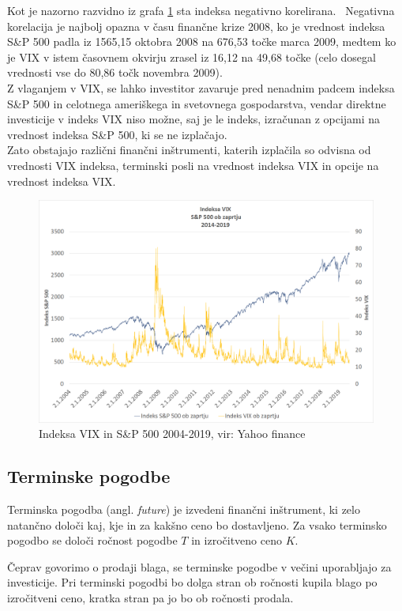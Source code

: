 \documentclass[12pt,a4paper]{amsart}
\theoremstyle{definition} %
\theoremstyle{plain} %
\begin{document}
Kot je nazorno razvidno iz grafa \ref{Graf 2} sta indeksa negativno korelirana. \
Negativna korelacija je najbolj opazna v času finančne krize 2008, ko je vrednost indeksa S\&P 500 padla iz 1565,15 oktobra 2008 na 676,53 točke marca 2009, medtem ko je VIX v istem časovnem okvirju zrasel iz 16,12 na 49,68 točke (celo dosegal vrednosti vse do 80,86 točk novembra 2009). \\
Z vlaganjem v VIX, se lahko investitor zavaruje pred nenadnim padcem indeksa S\&P 500 in celotnega ameriškega in svetovnega gospodarstva, vendar direktne investicije v indeks VIX niso možne, saj je le indeks, izračunan z  opcijami na vrednost indeksa S\&P 500, ki se ne izplačajo.\\
Zato obstajajo različni finančni inštrumenti, katerih izplačila so odvisna od vrednosti VIX indeksa, terminski posli na vrednost indeksa VIX in opcije na vrednost indeksa VIX. 
\begin{figure}[!h]
\centering
\includegraphics[width = 15 cm]{Grafi/VIX_vs_SPX_2004-2019.png}
\caption{Indeksa VIX in S\&P 500 2004-2019, vir: Yahoo finance}
\label{Graf 2}
\end{figure}
\newpage
\subsection{Terminske pogodbe}
Terminska pogodba (angl. \textit{future}) je izvedeni finančni inštrument, ki zelo natančno določi kaj, kje in za kakšno ceno bo dostavljeno. Za vsako terminsko pogodbo se določi ročnost pogodbe $T$ in izročitveno ceno $K$.\

Čeprav govorimo o prodaji blaga, se terminske pogodbe v večini uporabljajo za investicije. Pri terminski pogodbi bo dolga stran ob ročnosti kupila blago po izročitveni ceno, kratka stran pa jo bo ob ročnosti prodala.\
\end{document}
